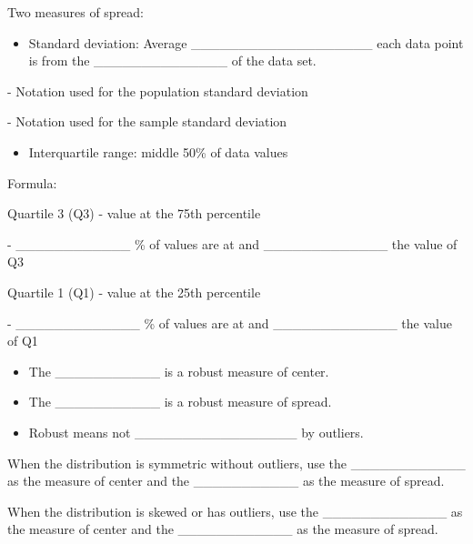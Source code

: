 \documentclass[
]{report}
\providecommand{\tightlist}{%
  \setlength{\itemsep}{0pt}\setlength{\parskip}{0pt}}
\newcommand{\rgi}{\hspace{24pt}}  %
\begin{document}
Two measures of spread:

\begin{itemize}
\tightlist
\item
  Standard deviation: Average \_\_\_\_\_\_\_\_\_\_\_\_\_\_\_\_\_\_\_ each data point is from the \_\_\_\_\_\_\_\_\_\_\_\_\_\_ of the data set.
\end{itemize}

\vspace{1mm}

\rgi \rgi - Notation used for the population standard deviation

\vspace{0.2in}

\rgi \rgi - Notation used for the sample standard deviation

\vspace{0.2in}

\begin{itemize}
\tightlist
\item
  Interquartile range: middle 50\% of data values
\end{itemize}

\rgi Formula:

\newpage

\rgi \rgi Quartile 3 (Q3) - value at the 75th percentile

\rgi \rgi - \_\_\_\_\_\_\_\_\_\_\_\_ \% of values are at and \_\_\_\_\_\_\_\_\_\_\_\_\_ the value of Q3

\rgi \rgi Quartile 1 (Q1) - value at the 25th percentile

\rgi \rgi - \_\_\_\_\_\_\_\_\_\_\_\_\_ \% of values are at and \_\_\_\_\_\_\_\_\_\_\_\_\_ the value of Q1

\vspace{1mm}

\begin{itemize}
\item
  The \_\_\_\_\_\_\_\_\_\_\_ is a robust measure of center.
\item
  The \_\_\_\_\_\_\_\_\_\_\_ is a robust measure of spread.
\item
  Robust means not \_\_\_\_\_\_\_\_\_\_\_\_\_\_\_\_\_ by outliers.
\end{itemize}

When the distribution is symmetric without outliers, use the \_\_\_\_\_\_\_\_\_\_\_\_ as the measure of center and the \_\_\_\_\_\_\_\_\_\_\_ as the measure of spread.

When the distribution is skewed or has outliers, use the \_\_\_\_\_\_\_\_\_\_\_\_\_ as the measure of center and the \_\_\_\_\_\_\_\_\_\_\_\_ as the measure of spread.
\end{document}
